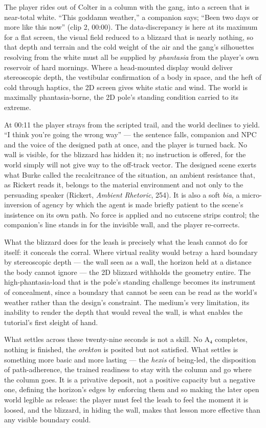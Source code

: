 The player rides out of Colter in a column with the gang, into a screen that is near-total white. ``This goddamn weather,'' a companion says; ``Been two days or more like this now'' (clip 2, 00:00). The data-discrepancy is here at its maximum for a flat screen, the visual field reduced to a blizzard that is nearly nothing, so that depth and terrain and the cold weight of the air and the gang's silhouettes resolving from the white must all be supplied by \textit{phantasia} from the player's own reservoir of hard mornings. Where a head-mounted display would deliver stereoscopic depth, the vestibular confirmation of a body in space, and the heft of cold through haptics, the 2D screen gives white static and wind. The world is maximally phantasia-borne, the 2D pole's standing condition carried to its extreme.

At 00:11 the player strays from the scripted trail, and the world declines to yield. ``I think you're going the wrong way'' — the sentence falls, companion and NPC and the voice of the designed path at once, and the player is turned back. No wall is visible, for the blizzard has hidden it; no instruction is offered, for the world simply will not give way to the off-track vector. The designed scene exerts what Burke called the recalcitrance of the situation, an ambient resistance that, as Rickert reads it, belongs to the material environment and not only to the persuading speaker (Rickert, \textit{Ambient Rhetoric}, 254). It is also a soft \textit{bia}, a micro-inversion of agency by which the agent is made briefly patient to the scene's insistence on its own path. No force is applied and no cutscene strips control; the companion's line stands in for the invisible wall, and the player re-corrects.

What the blizzard does for the leash is precisely what the leash cannot do for itself: it conceals the corral. Where virtual reality would betray a hard boundary by stereoscopic depth — the wall seen as a wall, the horizon held at a distance the body cannot ignore — the 2D blizzard withholds the geometry entire. The high-phantasia-load that is the pole's standing challenge becomes its instrument of concealment, since a boundary that cannot be seen can be read as the world's weather rather than the design's constraint. The medium's very limitation, its inability to render the depth that would reveal the wall, is what enables the tutorial's first sleight of hand.

What settles across these twenty-nine seconds is not a skill. No A₄ completes, nothing is finished, the \textit{orekton} is posited but not satisfied. What settles is something more basic and more lasting — the \textit{hexis} of being-led, the disposition of path-adherence, the trained readiness to stay with the column and go where the column goes. It is a privative deposit, not a positive capacity but a negative one, defining the horizon's edges by enforcing them and so making the later open world legible as release: the player must feel the leash to feel the moment it is loosed, and the blizzard, in hiding the wall, makes that lesson more effective than any visible boundary could.

